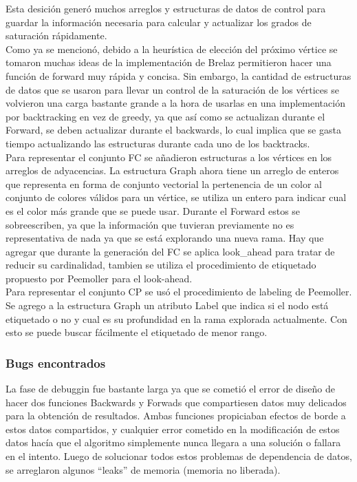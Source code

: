 \documentclass[a4paper,10pt]{article}
\begin{document}
\indent Esta desici\'on gener\'o muchos arreglos y estructuras de datos
de control para guardar la informaci\'on necesaria para calcular y
actualizar los grados de saturaci\'on r\'apidamente.\\

\indent Como ya se mencion\'o, debido a la heur\'istica de elecci\'on
del pr\'oximo v\'ertice se tomaron muchas ideas de la implementaci\'on
de Brelaz permitieron hacer una funci\'on de forward muy
r\'apida y concisa. Sin embargo, la cantidad de estructuras de datos que
se usaron para llevar un control de la saturaci\'on de los v\'ertices se
volvieron una carga bastante grande a la hora de usarlas en una
implementaci\'on por backtracking en vez de greedy, ya que as\'i como se
actualizan durante el Forward, se deben actualizar durante el backwards,
lo cual implica que se gasta tiempo actualizando las estructuras durante
cada uno de los backtracks.\\

\indent Para representar el conjunto FC se a\~nadieron estructuras a los
v\'ertices en los arreglos de adyacencias. La estructura Graph ahora
tiene un arreglo de enteros que representa en forma de conjunto
vectorial la pertenencia de un color al conjunto de colores v\'alidos
para un v\'ertice, se utiliza un entero para indicar cual es el color
m\'as grande que se puede usar. Durante el Forward estos se sobreescriben, ya que la
informaci\'on que tuvieran previamente no es representativa de nada ya
que se est\'a explorando una nueva rama. Hay que agregar que durante la
generaci\'on del FC se aplica look_ahead para tratar de reducir su
cardinalidad, tambien se utiliza el procedimiento de etiquetado
propuesto por Peemoller para el look-ahead.\\

\indent Para representar el conjunto CP se us\'o el procedimiento de labeling de
Peemoller. Se agrego a la estructura Graph un atributo Label que indica
si el nodo est\'a etiquetado o no y cual es su profundidad en la rama
explorada actualmente. Con esto se puede buscar f\'acilmente el
etiquetado de menor rango.

\subsubsection{Bugs encontrados}
La fase de debuggin fue bastante larga ya que se cometió el error de diseño 
de hacer dos funciones Backwards y Forwads que compartiesen datos muy delicados 
para la obtención de resultados. Ambas funciones propiciaban efectos de borde a estos 
datos compartidos, y cualquier error cometido en la modificación de estos datos hacía 
que el algoritmo simplemente nunca llegara a una solución o fallara en el intento. 
Luego de solucionar todos estos problemas de dependencia de datos, se arreglaron 
algunos ``leaks'' de memoria (memoria no liberada). 
\newpage
\end{document}
